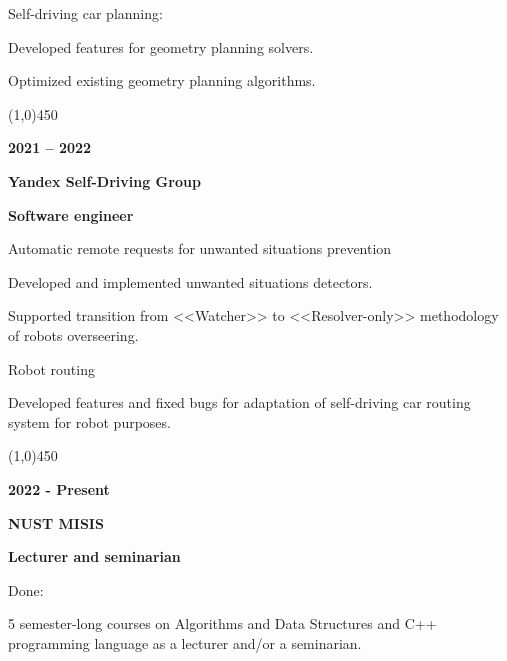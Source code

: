 \documentclass[a4paper,12pt,preview]{report}
\newcommand{\hr}{\begin{center} \line(1,0){450} \end{center}}
\begin{document}
\vspace{5mm} %

\begin{minipage}[c]{0.30\linewidth}
    Self-driving car planning:
\end{minipage}
\hfill
\begin{minipage}[c]{0.60\linewidth}	
	Developed features for geometry planning solvers.
	
	Optimized existing geometry planning algorithms.
\end{minipage}

\hr 

\begin{multicols}{2}
    \textbf{2021 – 2022} 

    \columnbreak

    \textbf{Yandex Self-Driving Group}

    \textbf{Software engineer}
\end{multicols}
\begin{minipage}[c]{0.30\linewidth}
    Automatic remote requests for unwanted situations prevention
\end{minipage}
\hfill
\begin{minipage}[c]{0.60\linewidth}
	Developed and implemented unwanted situations detectors.
	
	Supported transition from <<Watcher>> to <<Resolver-only>> methodology of robots overseering.
\end{minipage}

\vspace{5mm} %

\begin{minipage}[c]{0.30\linewidth}
    Robot routing
\end{minipage}
\hfill
\begin{minipage}[c]{0.60\linewidth}
	Developed features and fixed bugs for adaptation of self-driving car routing system for robot purposes.
\end{minipage}

\hr 

\begin{multicols}{2}
    \textbf{2022 - Present} 

    \columnbreak

    \textbf{NUST MISIS}

    \textbf{Lecturer and seminarian}
\end{multicols}

\begin{minipage}[c]{0.15\linewidth}
    Done:
\end{minipage}
\begin{minipage}[c]{0.75\linewidth}
	5 semester-long courses on Algorithms and Data Structures and C++ programming language as a lecturer and/or a seminarian.
\end{minipage}
\end{document}
